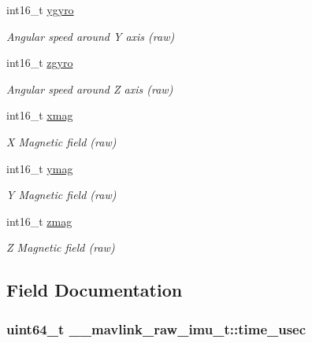 \begin{DoxyCompactItemize}
int16\+\_\+t \hyperlink{struct____mavlink__raw__imu__t_aff358c8fc1fb40d5862c7367d4bf80e9}{ygyro}
\begin{DoxyCompactList}\small\item\em Angular speed around Y axis (raw) \end{DoxyCompactList}\item 
int16\+\_\+t \hyperlink{struct____mavlink__raw__imu__t_a42af4ae862faf80bb6754e09db7ca9fe}{zgyro}
\begin{DoxyCompactList}\small\item\em Angular speed around Z axis (raw) \end{DoxyCompactList}\item 
int16\+\_\+t \hyperlink{struct____mavlink__raw__imu__t_a4aa7dda8a63c114e2b60e5d9f767b9ba}{xmag}
\begin{DoxyCompactList}\small\item\em X Magnetic field (raw) \end{DoxyCompactList}\item 
int16\+\_\+t \hyperlink{struct____mavlink__raw__imu__t_a813c4472362512205eb1035d67f80ff2}{ymag}
\begin{DoxyCompactList}\small\item\em Y Magnetic field (raw) \end{DoxyCompactList}\item 
int16\+\_\+t \hyperlink{struct____mavlink__raw__imu__t_a9c91b2950a80f2598bb7c1ed484cb74a}{zmag}
\begin{DoxyCompactList}\small\item\em Z Magnetic field (raw) \end{DoxyCompactList}\end{DoxyCompactItemize}


\subsection{Field Documentation}
\hypertarget{struct____mavlink__raw__imu__t_a571520057ab2c9fa547fca7755099dfc}{
\subsubsection[{time\+\_\+usec}]{\setlength{\rightskip}{0pt plus 5cm}uint64\+\_\+t \+\_\+\+\_\+mavlink\+\_\+raw\+\_\+imu\+\_\+t\+::time\+\_\+usec}}\label{struct____mavlink__raw__imu__t_a571520057ab2c9fa547fca7755099dfc}


